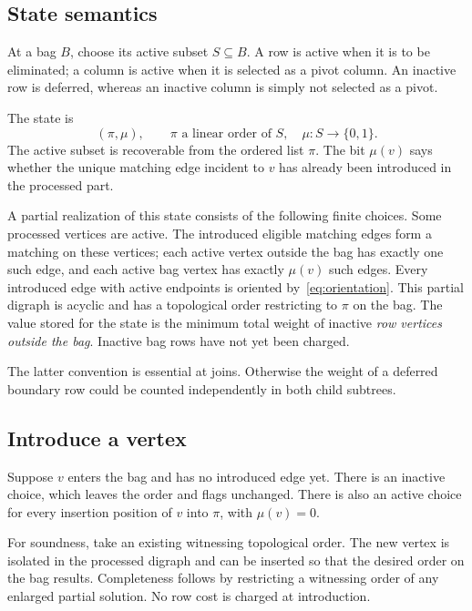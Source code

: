 \documentclass[11pt]{article}
\theoremstyle{definition}\newtheorem{definition}[theorem]{Definition}
\theoremstyle{remark}\newtheorem{remark}[theorem]{Remark}
\begin{document}
\subsection{State semantics}
At a bag $B$, choose its active subset $S\subseteq B$. A row is active when it is to be eliminated; a column is active when it is selected as a pivot column. An inactive row is deferred, whereas an inactive column is simply not selected as a pivot.

The state is
\begin{equation}
 (\pi,\mu),
 \qquad
 \pi\text{ a linear order of }S,
 \quad \mu:S\longrightarrow\{0,1\}.
 \label{eq:state}
\end{equation}
The active subset is recoverable from the ordered list $\pi$. The bit $\mu(v)$ says whether the unique matching edge incident to $v$ has already been introduced in the processed part.

A partial realization of this state consists of the following finite choices. Some processed vertices are active. The introduced eligible matching edges form a matching on these vertices; each active vertex outside the bag has exactly one such edge, and each active bag vertex has exactly $\mu(v)$ such edges. Every introduced edge with active endpoints is oriented by~\eqref{eq:orientation}. This partial digraph is acyclic and has a topological order restricting to $\pi$ on the bag. The value stored for the state is the minimum total weight of inactive \emph{row vertices outside the bag}. Inactive bag rows have not yet been charged.

The latter convention is essential at joins. Otherwise the weight of a deferred boundary row could be counted independently in both child subtrees.

\subsection{Introduce a vertex}
Suppose $v$ enters the bag and has no introduced edge yet. There is an inactive choice, which leaves the order and flags unchanged. There is also an active choice for every insertion position of $v$ into $\pi$, with $\mu(v)=0$.

For soundness, take an existing witnessing topological order. The new vertex is isolated in the processed digraph and can be inserted so that the desired order on the bag results. Completeness follows by restricting a witnessing order of any enlarged partial solution. No row cost is charged at introduction.
\end{document}
